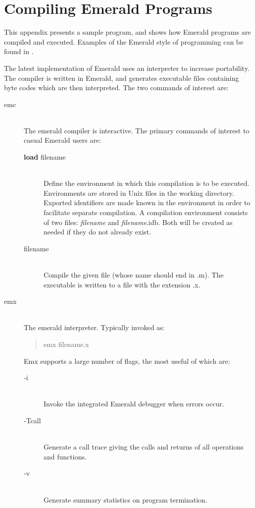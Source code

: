 \section{Compiling Emerald Programs}
\label{compiler appendix}

This appendix presents a sample \emd{} program, and shows how
Emerald programs are compiled and executed.  
Examples of the Emerald style of programming can be found
in \cite{Raj90spe}.

The latest implementation of Emerald uses an interpreter to increase
portability.  The compiler is written in Emerald, and generates executable
files containing byte codes which are then interpreted.  The two commands of
interest are:
\begin{description}
  \item[emc]{}~\\
    The emerald compiler is interactive.  The primary commands of interest
    to casual Emerald users are:
    \begin{description}
      \item[{\bf load} filename]{} ~\\
	Define the environment in which this compilation is to be executed.
	Environments are stored in Unix files in the working directory.  
	Exported identifiers are made known in the environment
	in order to facilitate separate compilation.  A compilation
	environment consists of two files:  {\it filename\/} and {\it
	filename\/}.idb.  Both will be created as needed if they do not
	already exist.
      \item[filename]{} ~\\
	Compile the given file (whose name should end in .m).  The
	executable is written to a file with the extension .x.
    \end{description}
  \item[emx]{} ~\\
    The emerald interpreter.  Typically invoked as:
    \begin{quote}
      emx filename.x
    \end{quote}
    Emx supports a large number of flags, the most useful of which are:
    \begin{description}
      \item[-i]{} ~\\
	Invoke the integrated Emerald debugger when errors occur.
      \item[-Tcall]{} ~\\
	Generate a call trace giving the calls and returns of all operations
	and functions.
      \item[-v]{} ~\\
	Generate summary statistics on program termination.
    \end{description}
\end{description}

